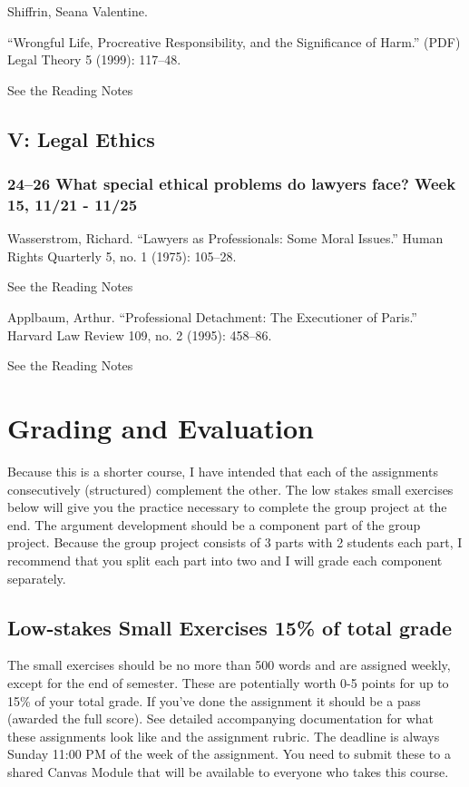 \documentclass[11pt,]{article}
\begin{document}
Shiffrin, Seana Valentine.

``Wrongful Life, Procreative Responsibility, and the Significance of
Harm.'' (PDF) Legal Theory 5 (1999): 117--48.

See the Reading Notes

\subsection{V: Legal Ethics}\label{v-legal-ethics}

\subsubsection{24--26 What special ethical problems do lawyers face?
Week 15, 11/21 -
11/25}\label{what-special-ethical-problems-do-lawyers-face-week-15-1121---1125}

Wasserstrom, Richard. ``Lawyers as Professionals: Some Moral Issues.''
Human Rights Quarterly 5, no. 1 (1975): 105--28.

See the Reading Notes

Applbaum, Arthur. ``Professional Detachment: The Executioner of Paris.''
Harvard Law Review 109, no. 2 (1995): 458--86.

See the Reading Notes

\section{Grading and Evaluation}\label{grading-and-evaluation}

Because this is a shorter course, I have intended that each of the
assignments consecutively (structured) complement the other. The low
stakes small exercises below will give you the practice necessary to
complete the group project at the end. The argument development should
be a component part of the group project. Because the group project
consists of 3 parts with 2 students each part, I recommend that you
split each part into two and I will grade each component separately.

\subsection{Low-stakes Small Exercises 15\% of total
grade}\label{low-stakes-small-exercises-15-of-total-grade}

The small exercises should be no more than 500 words and are assigned
weekly, except for the end of semester. These are potentially worth 0-5
points for up to 15\% of your total grade. If you've done the assignment
it should be a pass (awarded the full score). See detailed accompanying
documentation for what these assignments look like and the assignment
rubric. The deadline is always Sunday 11:00 PM of the week of the
assignment. You need to submit these to a shared Canvas Module that will
be available to everyone who takes this course.
\end{document}
